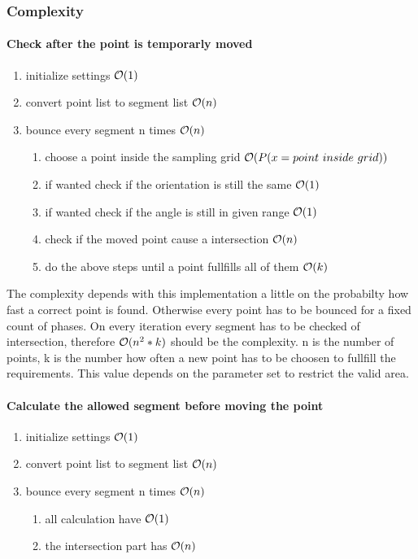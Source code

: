 \subsubsection{Complexity}
\paragraph{Check after the point is temporarly moved}
\begin{enumerate}
  \item initialize settings $\mathcal{O}(1)$
  \item convert point list to segment list $\mathcal{O}(n)$
  \item bounce every segment n times $\mathcal{O}(n)$
  \begin{enumerate}
    \item choose a point inside the sampling grid $\mathcal{O}(P(x = point\ inside\ grid))$
    \item if wanted check if the orientation is still the same $\mathcal{O}(1)$
    \item if wanted check if the angle is still in given range $\mathcal{O}(1)$
    \item check if the moved point cause a intersection $\mathcal{O}(n)$
    \item do the above steps until a point fullfills all of them $\mathcal{O}(k)$
  \end{enumerate}
\end{enumerate}
The complexity depends with this implementation a little on the
probabilty how fast a correct point is found. Otherwise every point
has to be bounced for a fixed count of phases. On every iteration
every segment has to be checked of intersection, therefore
$\mathcal{O}(n^2*k)$ should be the complexity. n is the number of points, k
is the number how often a new point has to be choosen to fullfill the
requirements. This value depends on the parameter set to restrict the
valid area.

\paragraph{Calculate the allowed segment before moving the point}
\begin{enumerate}
  \item initialize settings $\mathcal{O}(1)$
  \item convert point list to segment list $\mathcal{O}(n)$
  \item bounce every segment n times $\mathcal{O}(n)$
  \begin{enumerate}
    \item all calculation have $\mathcal{O}(1)$
    \item the intersection part has $\mathcal{O}(n)$
  \end{enumerate}
\end{enumerate}

